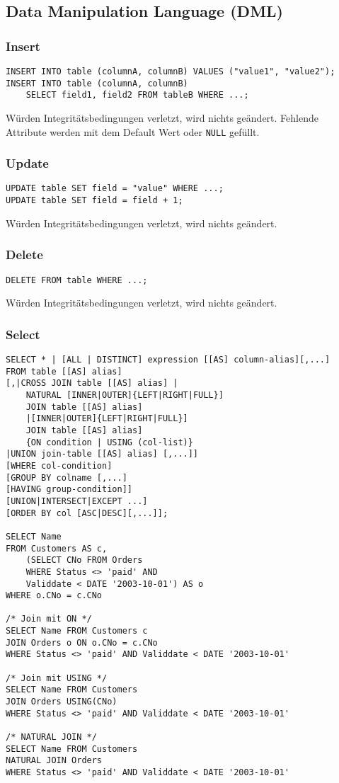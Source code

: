 \subsection{Data Manipulation Language (DML)}
\subsubsection{Insert}
\begin{lstlisting}
INSERT INTO table (columnA, columnB) VALUES ("value1", "value2");
INSERT INTO table (columnA, columnB) 
	SELECT field1, field2 FROM tableB WHERE ...;
\end{lstlisting}
Würden Integritätsbedingungen verletzt, wird nichts geändert. Fehlende Attribute werden mit dem Default Wert oder \texttt{NULL} gefüllt.

\subsubsection{Update}
\begin{lstlisting}
UPDATE table SET field = "value" WHERE ...;
UPDATE table SET field = field + 1;
\end{lstlisting}
Würden Integritätsbedingungen verletzt, wird nichts geändert.

\subsubsection{Delete}
\begin{lstlisting}
DELETE FROM table WHERE ...;
\end{lstlisting}
Würden Integritätsbedingungen verletzt, wird nichts geändert.

\subsubsection{Select}
\begin{lstlisting}
SELECT * | [ALL | DISTINCT] expression [[AS] column-alias][,...]
FROM table [[AS] alias]
[,|CROSS JOIN table [[AS] alias] |
	NATURAL [INNER|OUTER]{LEFT|RIGHT|FULL}]
	JOIN table [[AS] alias]
	|[INNER|OUTER]{LEFT|RIGHT|FULL}]
	JOIN table [[AS] alias]
	{ON condition | USING (col-list)}
|UNION join-table [[AS] alias] [,...]]
[WHERE col-condition]
[GROUP BY colname [,...]
[HAVING group-condition]]
[UNION|INTERSECT|EXCEPT ...]
[ORDER BY col [ASC|DESC][,...]];

SELECT Name
FROM Customers AS c,
	(SELECT CNo FROM Orders
	WHERE Status <> 'paid' AND
	Validdate < DATE '2003-10-01') AS o
WHERE o.CNo = c.CNo

/* Join mit ON */
SELECT Name FROM Customers c 
JOIN Orders o ON o.CNo = c.CNo
WHERE Status <> 'paid' AND Validdate < DATE '2003-10-01'

/* Join mit USING */
SELECT Name FROM Customers 
JOIN Orders USING(CNo)
WHERE Status <> 'paid' AND Validdate < DATE '2003-10-01'

/* NATURAL JOIN */
SELECT Name FROM Customers 
NATURAL JOIN Orders 
WHERE Status <> 'paid' AND Validdate < DATE '2003-10-01'
\end{lstlisting}

